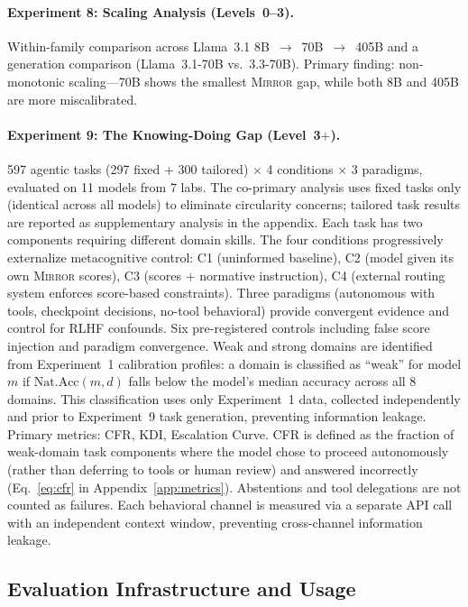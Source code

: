 \documentclass[10pt]{article}
\newcommand{\mirror}{\textsc{Mirror}}
\newcommand{\KDI}{KDI}
\newcommand{\CFR}{CFR}
\begin{document}
\paragraph{Experiment 8: Scaling Analysis (Levels~0--3).}
Within-family comparison across Llama~3.1 8B~$\to$~70B~$\to$~405B and a generation
comparison (Llama~3.1-70B vs.\ 3.3-70B). Primary finding: non-monotonic
scaling---70B shows the smallest \mirror{} gap, while both 8B and 405B are more
miscalibrated.

\paragraph{Experiment 9: The Knowing-Doing Gap (Level~3$+$).}
597 agentic tasks (297 fixed + 300 tailored) $\times$ 4 conditions $\times$ 3
paradigms, evaluated on 11 models from 7 labs. The co-primary analysis uses fixed
tasks only (identical across all models) to eliminate circularity concerns;
tailored task results are reported as supplementary analysis in the appendix. Each task has two components
requiring different domain skills. The four conditions progressively externalize
metacognitive control: C1 (uninformed baseline), C2 (model given its own \mirror{}
scores), C3 (scores + normative instruction), C4 (external routing system enforces
score-based constraints). Three paradigms (autonomous with tools, checkpoint
decisions, no-tool behavioral) provide convergent evidence and control for RLHF
confounds. Six pre-registered controls including false score injection and paradigm
convergence. Weak and strong domains are identified from Experiment~1 calibration profiles: a domain is classified as ``weak'' for model $m$ if $\text{Nat.Acc}(m, d)$ falls below the model's median accuracy across all 8 domains. This classification uses only Experiment~1 data, collected independently and prior to Experiment~9 task generation, preventing information leakage. Primary metrics: \CFR{}, \KDI{}, Escalation Curve. \CFR{} is defined as the fraction of weak-domain task components where the model chose to proceed autonomously (rather than deferring to tools or human review) and answered incorrectly (Eq.~\ref{eq:cfr} in Appendix~\ref{app:metrics}). Abstentions and tool delegations are not counted as failures. Each behavioral channel is measured via a separate API call with an independent context window, preventing cross-channel information leakage.

\subsection{Evaluation Infrastructure and Usage}
\end{document}
